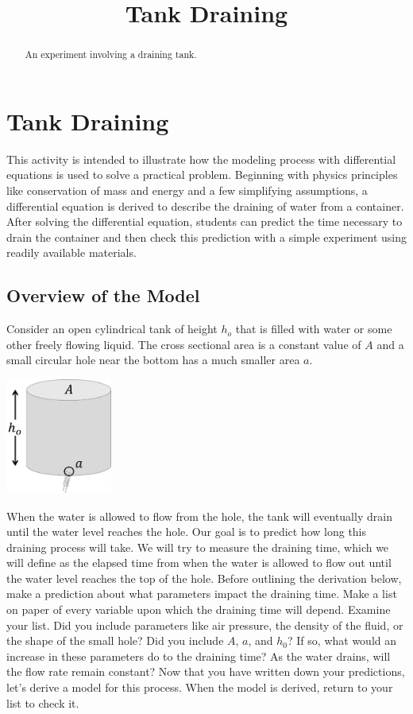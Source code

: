 \documentclass{ximera}
\title{Tank Draining}
\begin{document}
   
\begin{abstract}
An experiment involving a draining tank.
\end{abstract}
   
\maketitle
   
\section*{Tank Draining} 
 
This activity is intended to illustrate how the modeling process with differential equations is used to solve a practical problem.  Beginning with physics principles like conservation of mass and energy and a few simplifying assumptions, a differential equation is derived to describe the draining of water from a container.  After solving the differential equation, students can predict the time necessary to drain the container and then check this prediction with a simple experiment using readily available materials.
 
\subsection*{Overview of the Model}
 
Consider an open cylindrical tank of height $h_o$ that is filled with water or some other freely flowing liquid.  The cross sectional area is a constant value of $A$ and a small circular hole near the bottom has a much smaller area $a$. 
 
\begin{image}
 \includegraphics[height=1.5in]{drainingTank1.jpg}
\end{image}
 
When the water is allowed to flow from the hole, the tank will eventually drain until the water level reaches the hole.  Our goal is to predict how long this draining process will take.  We will try to measure the draining time, which we will define as the elapsed time from when the water is allowed to flow out until the water level reaches the top of the hole.  Before outlining the derivation below, make a prediction about what parameters impact the draining time.  Make a list on paper of every variable upon which the draining time will depend.
Examine your list.  Did you include parameters like air pressure, the density of the fluid, or the shape of the small hole?  Did you include $A$, $a$, and $h_0$?  If so, what would an increase in these parameters do to the draining time?  As the water drains, will the flow rate remain constant?  Now that you have written down your predictions, let’s derive a model for this process.  When the model is derived, return to your list to check it.
\end{document}
